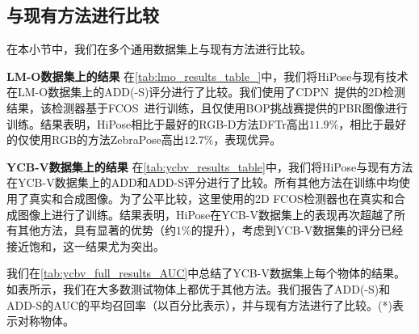 \subsection{与现有方法进行比较}
在本小节中，我们在多个通用数据集上与现有方法进行比较。



\textbf{LM-O数据集上的结果 } 在\autoref{tab:lmo_results_table_}中，我们将HiPose与现有技术在LM-O数据集上的ADD(-S)评分进行了比较。我们使用了CDPN~\cite{li2019cdpn}提供的2D检测结果，该检测器基于FCOS~\cite{Tian2019FCOSFC}进行训练，且仅使用BOP挑战赛提供的PBR图像进行训练。结果表明，HiPose相比于最好的RGB-D方法DFTr高出$11.9\%$，相比于最好的仅使用RGB的方法ZebraPose高出$12.7\%$，表现优异。



\textbf{YCB-V数据集上的结果 } 在\autoref{tab:ycbv_results_table}中，我们将HiPose与现有方法在YCB-V数据集上的ADD和ADD-S评分进行了比较。所有其他方法在训练中均使用了真实和合成图像。为了公平比较，这里使用的2D FCOS检测器也在真实和合成图像上进行了训练。结果表明，HiPose在YCB-V数据集上的表现再次超越了所有其他方法，具有显著的优势（约$1\%$的提升），考虑到YCB-V数据集的评分已经接近饱和，这一结果尤为突出。

我们在\autoref{tab:ycbv_full_results_AUC}中总结了YCB-V数据集上每个物体的结果。如表所示，我们在大多数测试物体上都优于其他方法。我们报告了ADD(-S)和ADD-S的AUC的平均召回率（以百分比表示），并与现有方法进行了比较。(*)表示对称物体。



